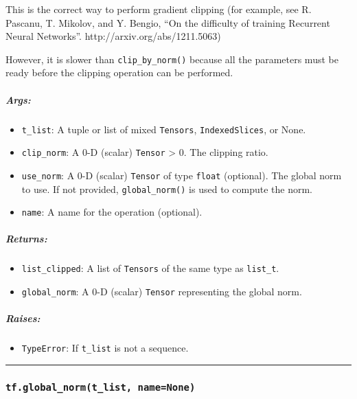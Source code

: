 This is the correct way to perform gradient clipping (for example, see
R. Pascanu, T. Mikolov, and Y. Bengio, ``On the difficulty of training
Recurrent Neural Networks''. http://arxiv.org/abs/1211.5063)

However, it is slower than \texttt{clip\_by\_norm()} because all the
parameters must be ready before the clipping operation can be performed.

\subparagraph{Args: }\label{args-16}

\begin{itemize}
\tightlist
\item
  \texttt{t\_list}: A tuple or list of mixed \texttt{Tensors},
  \texttt{IndexedSlices}, or None.
\item
  \texttt{clip\_norm}: A 0-D (scalar) \texttt{Tensor} \textgreater{} 0.
  The clipping ratio.
\item
  \texttt{use\_norm}: A 0-D (scalar) \texttt{Tensor} of type
  \texttt{float} (optional). The global norm to use. If not provided,
  \texttt{global\_norm()} is used to compute the norm.
\item
  \texttt{name}: A name for the operation (optional).
\end{itemize}

\subparagraph{Returns: }\label{returns-10}

\begin{itemize}
\tightlist
\item
  \texttt{list\_clipped}: A list of \texttt{Tensors} of the same type as
  \texttt{list\_t}.
\item
  \texttt{global\_norm}: A 0-D (scalar) \texttt{Tensor} representing the
  global norm.
\end{itemize}

\subparagraph{Raises: }\label{raises-7}

\begin{itemize}
\tightlist
\item
  \texttt{TypeError}: If \texttt{t\_list} is not a sequence.
\end{itemize}

\begin{center}\rule{0.5\linewidth}{\linethickness}\end{center}

\subsubsection{\texorpdfstring{\texttt{tf.global\_norm(t\_list,\ name=None)}
}{tf.global\_norm(t\_list, name=None) }}\label{tf.globalux5fnormtux5flist-namenone}

